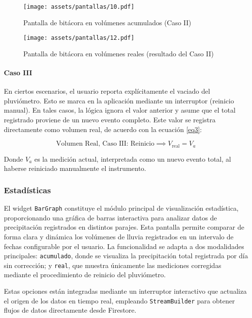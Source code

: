 \begin{figure}[h!]
\centering
\texttt{[image: assets/pantallas/10.pdf]}
\caption{Pantalla de bitácora en volúmenes acumulados (Caso II)}
\label{pantallas10}
\end{figure}

\begin{figure}[h!]
\centering
\texttt{[image: assets/pantallas/12.pdf]}
\caption{Pantalla de bitácora en volúmenes reales (resultado del Caso II)}
\label{pantallas12}
\end{figure}


\paragraph{Caso III}

En ciertos escenarios, el usuario reporta explícitamente el vaciado del pluviómetro. Esto se marca en la aplicación mediante un interruptor (reinicio manual). En tales casos, la lógica ignora el valor anterior y asume que el total registrado proviene de un nuevo evento completo. Este valor se registra directamente como volumen real, de acuerdo con la ecuación \ref{eq3}:

\begin{equation}
\text{Volumen Real, Caso III: Reinicio} \implies V_{\text{real}} = V_{a}
\label{eq3}
\end{equation}

Donde $V_{a}$ es la medición actual, interpretada como un nuevo evento total, al haberse reiniciado manualmente el instrumento.


\newpage
\subsubsection*{Estadísticas} 

El widget \texttt{BarGraph} constituye el módulo principal de visualización estadística, proporcionando una gráfica de barras interactiva para analizar datos de precipitación registrados en distintos parajes. Esta pantalla permite comparar de forma clara y dinámica los volúmenes de lluvia registrados en un intervalo de fechas configurable por el usuario. La funcionalidad se adapta a dos modalidades principales: \texttt{acumulado}, donde se visualiza la precipitación total registrada por día sin corrección; y \texttt{real}, que muestra únicamente las mediciones corregidas mediante el procedimiento de reinicio del pluviómetro. 

Estas opciones están integradas mediante un interruptor interactivo que actualiza el origen de los datos en tiempo real, empleando \texttt{StreamBuilder} para obtener flujos de datos directamente desde Firestore.

